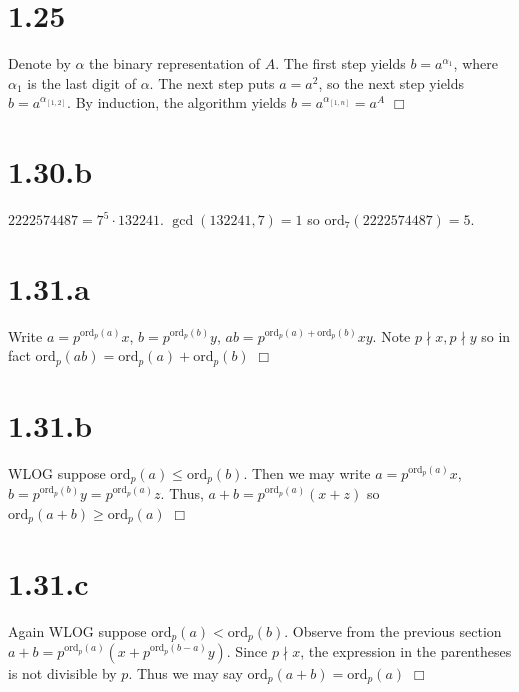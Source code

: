 \documentclass{article}
\begin{document}
\section*{1.25}
Denote by $\alpha$ the binary representation of $A$. The first step yields $b = a^{\alpha_1}$, where $\alpha_1$ is the last digit of $\alpha$. The next step puts $a = a^2$, so the next step yields $b = a^{\alpha_{[1,2]}}$. By induction, the algorithm yields $b = a^{\alpha_{[1,n]}} = a^A$ $\Box$

\section*{1.30.b}
$2222574487 = 7^5 \cdot 132241$. $\gcd(132241, 7) = 1$ so $\mathrm{ord}_7(2222574487) = 5$.

\section*{1.31.a}
Write $a = p^{\mathrm{ord}_p(a)}x$, $b = p^{\mathrm{ord}_p(b)}y$, $ab = p^{\mathrm{ord}_p(a)+\mathrm{ord}_p(b)}xy$. Note $p \nmid x, p \nmid y$ so in fact $\mathrm{ord}_p(ab) = \mathrm{ord}_p(a) + \mathrm{ord}_p(b)$ $\Box$

\section*{1.31.b}
WLOG suppose $\mathrm{ord}_p(a) \leqslant \mathrm{ord}_p(b)$. Then we may write $a = p^{\mathrm{ord}_p(a)}x$, $b = p^{\mathrm{ord}_p(b)}y = p^{\mathrm{ord}_p(a)}z$. Thus, $a + b = p^{\mathrm{ord}_p(a)}(x + z)$ so $\mathrm{ord}_p(a+b) \geq \mathrm{ord}_p(a)$ $\Box$

\section*{1.31.c}
Again WLOG suppose $\mathrm{ord}_p(a) < \mathrm{ord}_p(b)$. Observe from the previous section $a + b = p^{\mathrm{ord}_p(a)}(x + p^{\mathrm{ord}_p(b-a)}y)$. Since $p \nmid x$, the expression in the parentheses is not divisible by $p$. Thus we may say $\mathrm{ord}_p(a+b) = \mathrm{ord}_p(a)$ $\Box$
\end{document}
